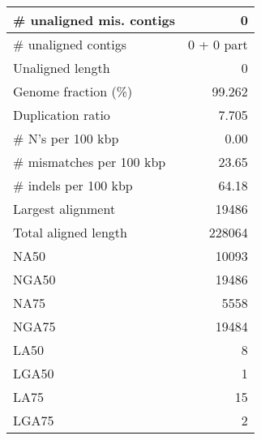 \documentclass[12pt,a4paper]{article}
\begin{document}
\begin{table}[ht]
\begin{center}
\begin{tabular}{|l*{1}{|r}|}
\# unaligned mis. contigs & 0 \\ \hline
\# unaligned contigs & 0 + 0 part \\ \hline
Unaligned length & 0 \\ \hline
Genome fraction (\%) & 99.262 \\ \hline
Duplication ratio & 7.705 \\ \hline
\# N's per 100 kbp & 0.00 \\ \hline
\# mismatches per 100 kbp & 23.65 \\ \hline
\# indels per 100 kbp & 64.18 \\ \hline
Largest alignment & 19486 \\ \hline
Total aligned length & 228064 \\ \hline
NA50 & 10093 \\ \hline
NGA50 & 19486 \\ \hline
NA75 & 5558 \\ \hline
NGA75 & 19484 \\ \hline
LA50 & 8 \\ \hline
LGA50 & 1 \\ \hline
LA75 & 15 \\ \hline
LGA75 & 2 \\ \hline
\end{tabular}
\end{center}
\end{table}
\end{document}
